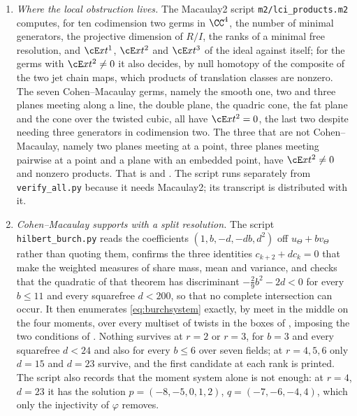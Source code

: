 \begin{enumerate}[label=\textup{(\Roman*)},leftmargin=*]
\item \emph{Where the local obstruction lives.} The Macaulay2 script
  \texttt{m2/lci\_\allowbreak products.m2} computes, for ten codimension two germs in
  $\CC^{4}$, the number of minimal generators, the projective dimension of
  $R/I$, the ranks of a minimal free resolution, and
  $\cE xt^{1}$, $\cE xt^{2}$ and $\cE xt^{3}$ of the ideal against itself; for
  the germs with $\cE xt^{2}\ne0$ it also decides, by null homotopy of the
  composite of the two jet chain maps, which products of translation classes
  are nonzero. The seven Cohen--Macaulay germs, namely the smooth one, two
  and three planes meeting along a line, the double plane, the quadric cone,
  the fat plane and the cone over the twisted cubic, all have
  $\cE xt^{2}=0$, the last two despite needing three generators in codimension
  two. The three that are not Cohen--Macaulay, namely two planes meeting at a
  point, three planes meeting pairwise at a point and a plane with an embedded
  point, have $\cE xt^{2}\ne0$ and nonzero products. That is
   and . The script runs separately
  from \texttt{verify\_all.py} because it needs Macaulay2; its transcript is
  distributed with it.

\item \emph{Cohen--Macaulay supports with a split resolution.} The script
  \texttt{hilbert\_\allowbreak burch.py} reads the coefficients
  $(1,b,-d,-db,d^{2})$ off $u_{\Theta}+bv_{\Theta}$ rather than quoting them,
  confirms the three identities $c_{k+2}+dc_{k}=0$ that make the weighted
  measures of  share mass, mean and variance, and checks that
  the quadratic of that theorem has discriminant $-\tfrac29b^{2}-2d<0$ for
  every $b\le11$ and every squarefree $d<200$, so that no complete
  intersection can occur. It then enumerates \eqref{eq:burchsystem} exactly,
  by meet in the middle on the four moments, over every multiset of twists in
  the boxes of , imposing the two conditions of
  . Nothing survives at $r=2$ or $r=3$, for $b=3$ and
  every squarefree $d<24$ and also for every $b\le6$ over seven fields; at
  $r=4,5,6$ only $d=15$ and $d=23$ survive, and the first candidate at each
  rank is printed. The script also records that the moment system alone is not
  enough: at $r=4$, $d=23$ it has the solution $p=(-8,-5,0,1,2)$,
  $q=(-7,-6,-4,4)$, which only the injectivity of $\varphi$ removes.


\end{enumerate}
